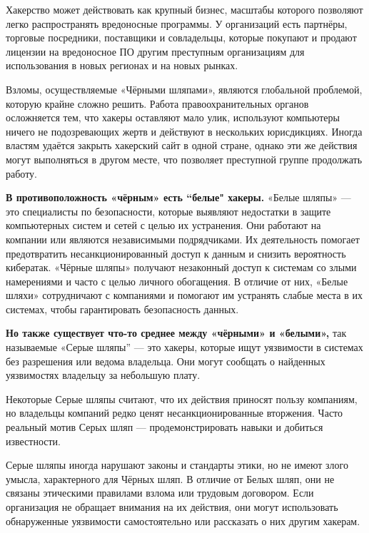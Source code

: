 Хакерство может действовать как крупный бизнес, масштабы которого позволяют легко распространять вредоносные программы. У организаций есть партнёры, торговые посредники, поставщики и совладельцы, которые покупают и продают лицензии на вредоносное ПО другим преступным организациям для использования в новых регионах и на новых рынках.

Взломы, осуществляемые «Чёрными шляпами», являются глобальной проблемой, которую крайне сложно решить. Работа 
правоохранительных органов осложняется тем, что хакеры оставляют мало улик, используют компьютеры ничего не подозревающих 
жертв и действуют в нескольких юрисдикциях. Иногда властям удаётся закрыть хакерский сайт в одной стране, однако эти же 
действия могут выполняться в другом месте, что позволяет преступной группе продолжать работу.

\textbf{В противоположность «чёрным» есть “белые" хакеры.} «Белые шляпы» — это специалисты по безопасности, которые выявляют недостатки в защите компьютерных систем и сетей с целью их устранения. Они работают на компании или являются независимыми 
подрядчиками. Их деятельность помогает предотвратить несанкционированный доступ к данным и снизить вероятность кибератак.
«Чёрные шляпы» получают незаконный доступ к системам со злыми намерениями и часто с целью личного обогащения. В отличие от 
них, «Белые шляхи» сотрудничают с компаниями и помогают им устранять слабые места в их системах, чтобы гарантировать 
безопасность данных.

\textbf{Но также существует что-то среднее между «чёрными» и «белыми»,} так называемые «Серые шляпы” — это хакеры, которые ищут 
уязвимости в системах без разрешения или ведома владельца. Они могут сообщать о найденных уязвимостях владельцу за небольшую 
плату.

Некоторые Серые шляпы считают, что их действия приносят пользу компаниям, но владельцы компаний редко ценят 
несанкционированные вторжения. Часто реальный мотив Серых шляп — продемонстрировать навыки и добиться известности.

Серые шляпы иногда нарушают законы и стандарты этики, но не имеют злого умысла, характерного для Чёрных шляп. В отличие от 
Белых шляп, они не связаны этическими правилами взлома или трудовым договором. Если организация не обращает внимания на их 
действия, они могут использовать обнаруженные уязвимости самостоятельно или рассказать о них другим хакерам.


\newpage
